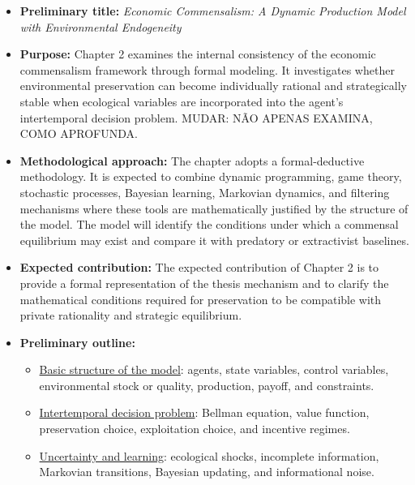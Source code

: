 \begin{itemize}

    \item \textbf{Preliminary title:} \emph{Economic Commensalism: A Dynamic Production Model with Environmental Endogeneity}

    \item \textbf{Purpose:} Chapter 2 examines the internal consistency of the economic commensalism framework through formal modeling. It investigates whether environmental preservation can become individually rational and strategically stable when ecological variables are incorporated into the agent's intertemporal decision problem. MUDAR: NÃO APENAS EXAMINA, COMO APROFUNDA.

    \item \textbf{Methodological approach:} The chapter adopts a formal-deductive methodology. It is expected to combine dynamic programming, game theory, stochastic processes, Bayesian learning, Markovian dynamics, and filtering mechanisms where these tools are mathematically justified by the structure of the model. The model will identify the conditions under which a commensal equilibrium may exist and compare it with predatory or extractivist baselines.

    \item \textbf{Expected contribution:} The expected contribution of Chapter 2 is to provide a formal representation of the thesis mechanism and to clarify the mathematical conditions required for preservation to be compatible with private rationality and strategic equilibrium.

    \item \textbf{Preliminary outline:}

    \begin{itemize}

        \item[i.] \underline{Basic structure of the model}: agents, state variables, control variables, environmental stock or quality, production, payoff, and constraints.

        \item[ii.] \underline{Intertemporal decision problem}: Bellman equation, value function, preservation choice, exploitation choice, and incentive regimes.

        \item[iii.] \underline{Uncertainty and learning}: ecological shocks, incomplete information, Markovian transitions, Bayesian updating, and informational noise.


\end{itemize}
\end{itemize}
